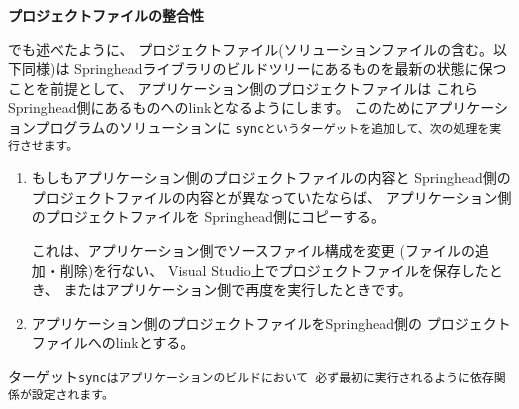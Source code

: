 \bigskip
\noindent
\bf{\KLUDGE プロジェクトファイルの整合性}
\begin{narrow}[20pt]
	\KLUDGE でも述べたように、
	\KLUDGE プロジェクトファイル(\KLUDGE ソリューションファイルの含む。以下同様)\KLUDGE は
	Springhead\KLUDGE ライブラリのビルドツリーにあるものを最新の状態に保つことを前提として、
	\KLUDGE アプリケーション側のプロジェクトファイルは
	\KLUDGE これらSpringhead\KLUDGE 側にあるものへのlink\KLUDGE となるようにします。
	\KLUDGE このためにアプリケーションプログラムのソリューションに
	\tt{sync}\KLUDGE というターゲットを追加して、次の処理を実行させます。
	\begin{enumerate}
	  \item	\KLUDGE もしもアプリケーション側のプロジェクトファイルの内容と
		Springhead\KLUDGE 側のプロジェクトファイルの内容とが異なっていたならば、
		\KLUDGE アプリケーション側のプロジェクトファイルを
		Springhead\KLUDGE 側にコピーする。
		\begin{narrow}[s][15pt]
		\KLUDGE これは、アプリケーション側でソースファイル構成を変更
		(\KLUDGE ファイルの追加・削除)\KLUDGE を行ない、
		Visual Studio\KLUDGE 上でプロジェクトファイルを保存したとき、
		\KLUDGE またはアプリケーション側で再度\cmake \KLUDGE を実行したときです。
		\end{narrow}

	  \item	\KLUDGE アプリケーション側のプロジェクトファイルをSpringhead\KLUDGE 側の
		\KLUDGE プロジェクトファイルへのlink\KLUDGE とする。
	\end{enumerate}
	\KLUDGE ターゲット\tt{sync}\KLUDGE はアプリケーションのビルドにおいて
	\KLUDGE 必ず最初に実行されるように依存関係が設定されます。
\end{narrow}	
